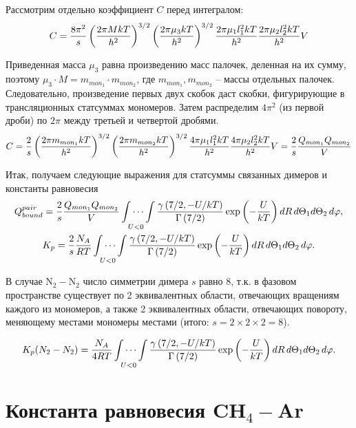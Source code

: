 \documentclass[12pt]{article}
\newcommand{\lb}{\left(}
\newcommand{\rb}{\right)}
\begin{document}
Рассмотрим отдельно коэффициент $C$ перед интегралом:
\begin{gather}
		C = \frac{8 \pi^2}{s} \lb \frac{2 \pi M k T}{h^2} \rb^{3/2} \lb \frac{2 \pi \mu_3 k T}{h^2} \rb^{3/2} \frac{2 \pi \mu_1 l_1^2 k T}{h^2} \frac{2 \pi \mu_2 l_2^2 k T}{h^2} V \notag
\end{gather}

Приведенная масса $\mu_3$ равна произведению масс палочек, деленная на их сумму, поэтому $\mu_3 \cdot M = m_{mon_1} \cdot m_{mon_2}$, где $m_{mon_1}, m_{mon_2}$ -- массы отдельных палочек. Следовательно, произведение первых двух скобок даст скобки, фигурирующие в трансляционных статсуммах мономеров. Затем распределим $4 \pi^2$ (из первой дроби) по $2 \pi$ между третьей и четвертой дробями.
\begin{gather}
		C = \frac{2}{s} \lb \frac{2 \pi m_{mon_1} k T}{h^2} \rb^{3/2} \lb \frac{2 \pi m_{mon_2} k T}{h^2} \rb^{3/2} \frac{4 \pi \mu_1 l_1^2 k T}{h^2} \frac{4 \pi \mu_2 l_2^2 k T}{h^2} V = \frac{2}{s} \frac{Q_{mon_1} Q_{mon_2}}{V} \notag
\end{gather}

Итак, получаем следующие выражения для статсуммы связанных димеров и константы равновесия 
\begin{gather}
		Q_{bound}^{pair} = \frac{2}{s} \frac{Q_{mon_1} Q_{mon_2}}{V} \idotsint\limits_{U < 0} \frac{\gamma \lb 7/2, - U/kT \rb}{\Gamma \lb 7/2 \rb} \exp \lb - \frac{U}{kT} \rb d R \, d \Theta_1 d \Theta_2 \, d \varphi, \notag \\     
		K_p = \frac{2}{s} \frac{N_A}{R T} \idotsint\limits_{U < 0} \frac{\gamma \lb 7/2, - U/kT \rb}{\Gamma \lb 7/2 \rb} \exp \lb - \frac{U}{kT} \rb d R \, d \Theta_1 d \Theta_2 \, d \varphi. \notag 
\end{gather}

В случае N$_2-$N$_2$ число симметрии димера $s$ равно 8, т.к. в фазовом пространстве существует по 2 эквивалентных области, отвечающих вращениям каждого из мономеров, а также 2 эквивалентных области, отвечающих повороту, меняющему местами мономеры местами (итого: $s = 2 \times 2 \times 2 = 8$).  

\begin{gather}
		K_p (N_2-N_2) = \frac{N_A}{4 R T} \idotsint\limits_{U < 0} \frac{\gamma \lb 7/2, - U/kT \rb}{\Gamma \lb 7/2 \rb} \exp \lb - \frac{U}{kT} \rb d R \, d \Theta_1 d \Theta_2 \, d \varphi. \notag 
\end{gather}

\newpage

\section*{Константа равновесия CH$_4-$Ar}
\end{document}
